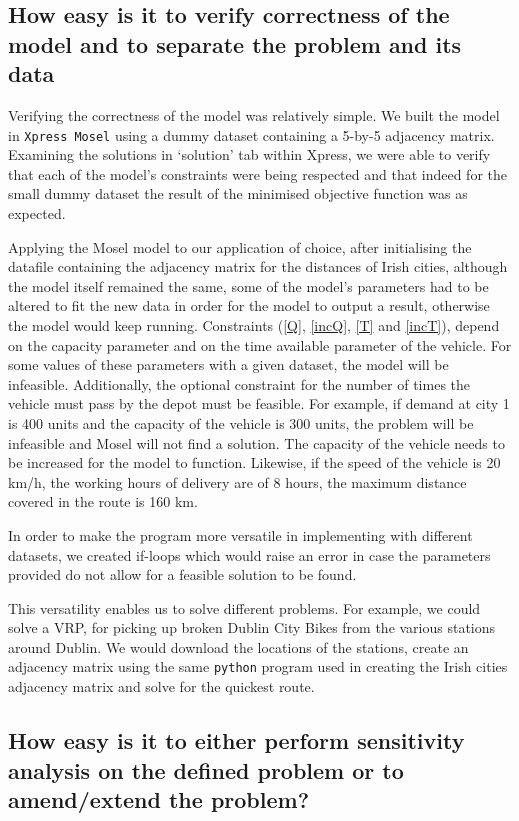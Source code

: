 \documentclass[a4paper,11pt]{article}
\begin{document}
\subsection{How easy is it to verify correctness of the model and to separate the problem and its data}
Verifying the correctness of the model was relatively simple. We built the model in \texttt{Xpress Mosel} using a dummy dataset containing a 5-by-5 adjacency matrix. Examining the solutions in `solution' tab within Xpress, we were able to verify that each of the model's constraints were being respected and that indeed for the small dummy dataset the result of the minimised objective function was as expected.

 Applying the Mosel model to our application of choice, after initialising the datafile containing the adjacency matrix for the distances of Irish cities, although the model itself remained the same, some of the model's parameters had to be altered to fit the new data in order for the model to output a result, otherwise the model would keep running. Constraints (\ref{Q}, \ref{incQ}, \ref{T} and \ref{incT}), depend on the capacity parameter and on the time available parameter of the vehicle. For some values of these parameters with a given dataset, the model will be infeasible. Additionally, the optional constraint for the number of times the vehicle must pass by the depot must be feasible. For example, if demand at city 1 is 400 units and the capacity of the vehicle is 300 units, the problem will be infeasible and Mosel will not find a solution. The capacity of the vehicle needs to be increased for the model to function. Likewise, if the speed of the vehicle is 20 km/h, the working hours of delivery are of 8 hours, the maximum distance covered in the route is 160 km.
 
In order to make the program more versatile in implementing with different datasets, we created if-loops which would raise an error in case the parameters provided do not allow for a feasible solution to be found.

This versatility enables us to solve different problems. For example, we could solve a VRP, for picking up broken Dublin City Bikes from the various stations around Dublin. We would download the locations of the stations, create an adjacency matrix using the same \texttt{python} program used in creating the Irish cities adjacency matrix and solve for the quickest route. 

\subsection{How easy is it to either perform sensitivity analysis on the defined problem or to
amend/extend the problem? }
\end{document}

